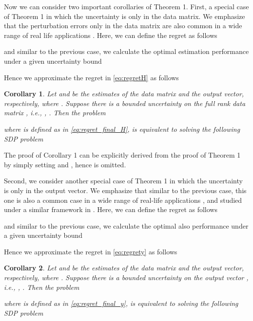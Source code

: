 \documentclass[review,sort&compress]{elsarticle}
\newtheorem{cor}{Corollary}
\begin{document}
Now we can consider two important corollaries of Theorem 1. First, a special case of Theorem 1 in which the uncertainty is only in the data matrix. We emphasize that the perturbation errors only in the data matrix are also common in a wide range of real life applications \cite{sayedbook}. Here, we can define the regret as follows

and similar to the previous case, we calculate the optimal estimation performance under a given uncertainty bound

Hence we approximate the regret in \eqref{eq:regretH} as follows


\begin{cor}\label{cor1}
Let  and  be the estimates of the data matrix and the output vector, respectively, where . Suppose there is a bounded uncertainty on the full rank data matrix , i.e., , . Then the problem

where  is defined as in \eqref{eq:regret_final_H}, is equivalent to solving the following SDP problem

\end{cor}

\begin{poc1}
The proof of Corollary 1 can be explicitly derived from the proof of Theorem 1 by simply setting  and , hence is omitted. \hfill 
\end{poc1}

Second, we consider another special case of Theorem 1 in which the uncertainty is only in the output vector. We emphasize that similar to the previous case, this one is also a common case in a wide range of real-life applications \cite{sayedbook}, and studied under a similar framework in \cite{yonina1}. Here, we can define the regret as follows

and similar to the previous case, we calculate the optimal also performance under a given uncertainty bound

Hence we approximate the regret in \eqref{eq:regrety} as follows


\begin{cor}\label{cor2}
Let  and  be the estimates of the data matrix and the output vector, respectively, where . Suppose there is a bounded uncertainty on the output vector , i.e., , . Then the problem

where  is defined as in \eqref{eq:regret_final_y}, is equivalent to solving the following SDP problem

\end{cor}
\end{document}
